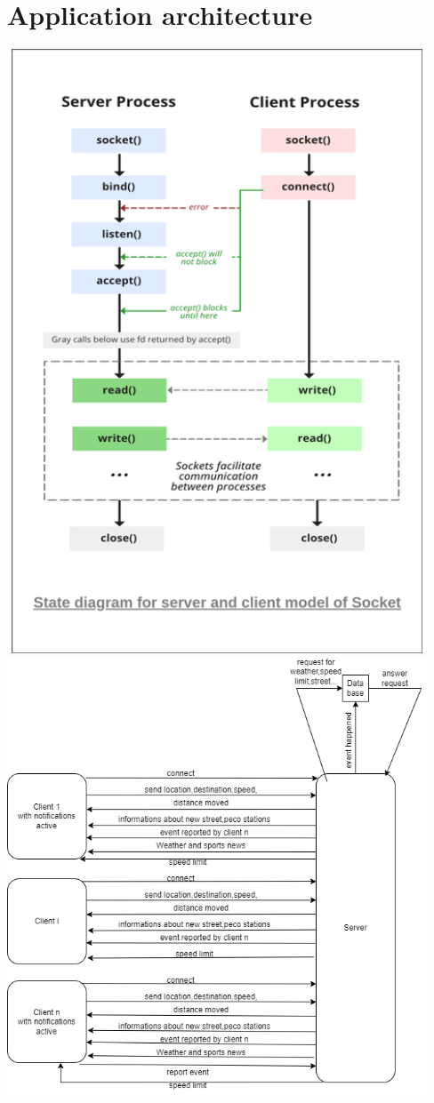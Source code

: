 \documentclass{article}
\begin{document}
\section{\textbf{Application architecture}}
\includegraphics[width=125mm,height=180mm]{tcp}\\
\break
\includegraphics[width=125mm]{sch}\\
\end{document}
